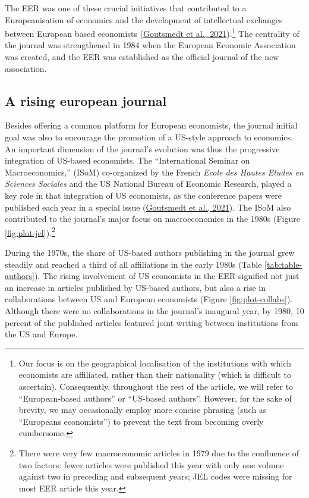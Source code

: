 \documentclass[
  12pt,
  onecolumn]{article}
\begin{document}
The EER was one of these crucial initiatives that contributed to a
Europeanisation of economics and the development of intellectual
exchanges between European based economists
(\protect\hyperlink{ref-goutsmedt2021}{Goutsmedt et al.,
2021}).\footnote{Our focus is on the geographical localisation of the
  institutions with which economists are affiliated, rather than their
  nationality (which is difficult to ascertain). Consequently,
  throughout the rest of the article, we will refer to ``European-based
  authors'' or ``US-based authors''. However, for the sake of brevity,
  we may occasionally employ more concise phrasing (such as ``Europeans
  economists'') to prevent the text from becoming overly cumbersome.}
The centrality of the journal was strengthened in 1984 when the European
Economic Association was created, and the EER was established as the
official journal of the new association.

\hypertarget{rising-journal}{%
\subsection{A rising european journal}\label{rising-journal}}

Besides offering a common platform for European economists, the journal
initial goal was also to encourage the promotion of a US-style approach
to economics. An important dimension of the journal's evolution was thus
the progressive integration of US-based economists. The ``International
Seminar on Macroeconomics,'' (ISoM) co-organized by the French
\emph{Ecole des Hautes Etudes en Sciences Sociales} and the US National
Bureau of Economic Research, played a key role in that integration of US
economists, as the conference papers were published each year in a
special issue (\protect\hyperlink{ref-goutsmedt2021}{Goutsmedt et al.,
2021}). The ISoM also contributed to the journal's major focus on
macroeconomics in the 1980s (Figure \ref{fig:plot-jel}).\footnote{There
  were very few macroeconomic articles in 1979 due to the confluence of
  two factors: fewer articles were published this year with only one
  volume against two in preceding and subsequent years; JEL codes were
  missing for most EER article this year.}

During the 1970s, the share of US-based authors publishing in the
journal grew steadily and reached a third of all affiliations in the
early 1980s (Table \ref{tab:table-authors}). The rising involvement of
US economists in the EER signified not just an increase in articles
published by US-based authors, but also a rise in collaborations between
US and European economists (Figure \ref{fig:plot-collabs}). Although
there were no collaborations in the journal's inaugural year, by 1980,
10 percent of the published articles featured joint writing between
institutions from the US and Europe.
\end{document}
